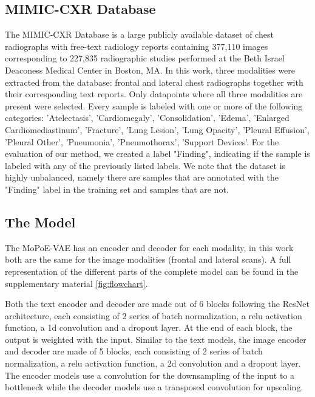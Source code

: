 \subsection{MIMIC-CXR Database}
The MIMIC-CXR Database \cite{johnson2019mimic} is a large publicly available dataset of chest radiographs with free-text radiology reports containing 377,110 images corresponding to 227,835 radiographic studies performed at the Beth Israel Deaconess Medical Center in Boston, MA.
In this work, three modalities were extracted from the database: frontal and lateral chest radiographs together with their corresponding text reports. Only datapoints where all three modalities are present were selected.
Every sample is labeled with one or more of the following categories: 'Atelectasis', 'Cardiomegaly', 'Consolidation', 'Edema', 'Enlarged Cardiomediastinum', 'Fracture', 'Lung Lesion', 'Lung Opacity', 'Pleural Effusion', 'Pleural Other', 'Pneumonia', 'Pneumothorax', 'Support Devices'.
For the evaluation of our method, we created a label "Finding", indicating if the sample is labeled with any of the previously listed labels.
We note that the dataset is highly unbalanced, namely there are  samples that are annotated with the "Finding" label in the training set and  samples that are not.

\subsection{The Model}
The MoPoE-VAE has an encoder and decoder for each modality, in this work both are the same for the image modalities (frontal and lateral scans).
A full representation of the different parts of the complete model can be found in the supplementary material \cref{fig:flowchart}.

Both the text encoder and decoder are made out of 6 blocks following the ResNet \cite{he2016deep} architecture, each consisting of 2 series of batch normalization, a relu activation function, a 1d convolution and a dropout layer.
At the end of each block, the output is weighted with the input.
Similar to the text models, the image encoder and decoder are made of 5 blocks, each consisting of 2 series of batch normalization, a relu activation function, a 2d convolution and a dropout layer.
The encoder models use a convolution for the downsampling of the input to a bottleneck while the decoder models use a transposed convolution for upscaling.

